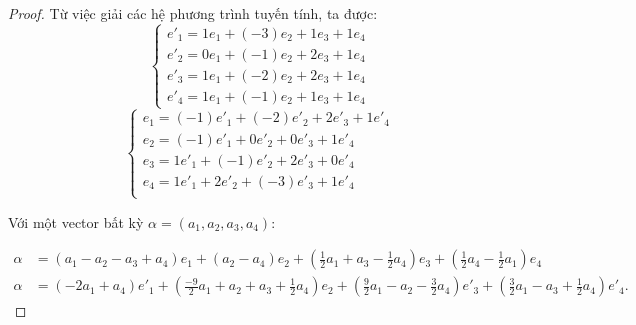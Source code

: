 \begin{proof}
    \bigskip
    Từ việc giải các hệ phương trình tuyến tính, ta được:
    \[
        \begin{cases}
            e'_{1} = 1e_{1} + (-3)e_{2} + 1e_{3} + 1e_{4} \\
            e'_{2} = 0e_{1} + (-1)e_{2} + 2e_{3} + 1e_{4} \\
            e'_{3} = 1e_{1} + (-2)e_{2} + 2e_{3} + 1e_{4} \\
            e'_{4} = 1e_{1} + (-1)e_{2} + 1e_{3} + 1e_{4}
        \end{cases}
    \]
    \[
        \begin{cases}
            e_{1} = (-1)e'_{1} + (-2)e'_{2} + 2e'_{3} + 1e'_{4} \\
            e_{2} = (-1)e'_{1} + 0e'_{2} + 0e'_{3} + 1e'_{4}    \\
            e_{3} = 1e'_{1} + (-1)e'_{2} + 2e'_{3} + 0e'_{4}    \\
            e_{4} = 1e'_{1} + 2e'_{2} + (-3)e'_{3} + 1e'_{4}    \\
        \end{cases}
    \]

    Với một vector bất kỳ $\alpha = (a_{1}, a_{2}, a_{3}, a_{4})$:

    \begin{align*}
        \alpha & = (a_{1} - a_{2} - a_{3} + a_{4})e_{1} + (a_{2} - a_{4})e_{2} + \left(\frac{1}{2}a_{1} + a_{3} - \frac{1}{2}a_{4} \right)e_{3} + \left(\frac{1}{2}a_{4} - \frac{1}{2}a_{1}\right)e_{4}                                               \\
        \alpha & = (-2a_{1} + a_{4})e'_{1} + \left(\frac{-9}{2}a_{1} + a_{2} + a_{3} + \frac{1}{2}a_{4}\right)e_{2} + \left(\frac{9}{2}a_{1} - a_{2} - \frac{3}{2}a_{4}\right)e'_{3} + \left(\frac{3}{2}a_{1} - a_{3} + \frac{1}{2}a_{4}\right)e'_{4}.
    \end{align*}
\end{proof}

